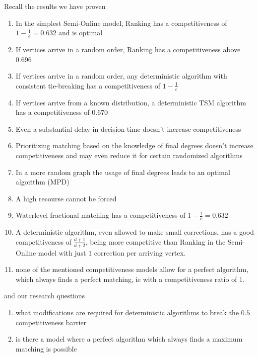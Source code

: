 Recall the results we have proven
\begin{enumerate}
	\item In the simplest Semi-Online model, Ranking has a competitiveness of $1-\frac{1}{e}=0.632$ and is optimal \label{RNK}
	\item If vertices arrive in a random order, Ranking has a competitiveness above $0.696$ \label{RA1}
	\item If vertices arrive in a random order, any deterministic algorithm with consistent tie-breaking has a competitiveness of $1-\frac{1}{e}$ \label{RA2}
	\item If vertices arrive from a known distribution, a deterministic TSM algorithm has a competitiveness of $0.670$ \label{TSM}
	\item Even a substantial delay in decision time doesn't increase competitiveness \label{delay}
	\item Prioritizing matching based on the knowledge of final degrees doesn't increase competitiveness and may even reduce it for certain randomized algorithms \label{RED}
	\item In a more random graph the usage of final degrees leads to an optimal algorithm (MPD) \label{MPD}
	\item A high recourse cannot be forced \label{Recourse}
	\item Waterlevel fractional matching has a competitiveness of $1-\frac{1}{e}=0.632$ \label{FRAC}
	\item A deterministic algorithm, even allowed to make small corrections, has a good competitiveness of $\frac{d+1}{d+2}$, being more competitive than Ranking in the Semi-Online model with just $1$ correction per arriving vertex. \label{COR}
	\item none of the mentioned competitiveness models allow for a perfect algorithm, which always finds a perfect matching, ie with a competitiveness ratio of $1$.
\end{enumerate}

and our research questions

\begin{enumerate}
	\item what modifications are required for deterministic algorithms to break the $0.5$ competitiveness barrier
	\item is there a model where a perfect algorithm which always finds a maximum matching is possible
\end{enumerate}

